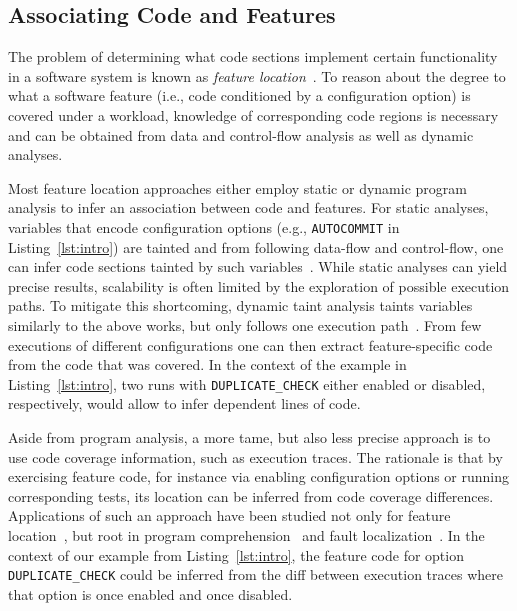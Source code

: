 {\color{gray}
\subsection{Associating Code and Features}\label{sec:feature_location}
The problem of determining what code sections implement certain functionality in a software system is known as \emph{feature location}~\cite{rubin_feature_2013}. To reason about the degree to what a software feature (i.e., code conditioned by a configuration option) is covered under a workload, knowledge of corresponding code regions is necessary and can be obtained from data and control-flow analysis as well as dynamic analyses.

Most feature location approaches either employ static or dynamic program analysis to infer an association between code and features. For static analyses, variables that encode configuration options (e.g., \texttt{AUTOCOMMIT} in Listing~\ref{lst:intro}) are tainted and from following data-flow and control-flow, one can infer code sections tainted by such variables~\cite{velez_2020_configcrusher_jase,lillack_2018_lotrack_tse,luo_2019_cova}.
While static analyses can yield precise results, scalability is often limited by the exploration of possible execution paths. To mitigate this shortcoming, dynamic taint analysis taints variables similarly to the above works, but only follows one execution path~\cite{bell_phosphor_2014,velez_comprex_2021,splat_kim_2013}. From few executions of different configurations one can then extract feature-specific code from the code that was covered. In the context of the example in Listing~\ref{lst:intro}, two runs with \texttt{DUPLICATE\_CHECK} either enabled or disabled, respectively, would allow to infer dependent lines of code.


Aside from program analysis, a more tame, but also less precise approach is to use code coverage information, such as execution traces.
The rationale is that by exercising feature code, for instance via enabling configuration options or running corresponding tests, its location can be inferred from code coverage differences. Applications of such an approach have been studied not only for feature location~\cite{wong_integrated_2005,sulir_annotation_2015,michelon_spectrum_2021,perez_framing_2016}, but root in program comprehension~\cite{wilde_early_1996,wilde_reconnaissance_1995,sherwood_reducing_nodate,perez_diagnosis_2014,castro_pangolin_2019} and fault localization~\cite{agrawal_fault_1995,wong_faultloc_2016}. In the context of our example from Listing~\ref{lst:intro}, the feature code for option \texttt{DUPLICATE\_CHECK} could be inferred from the diff between execution traces where that option is once enabled and once disabled.
}

